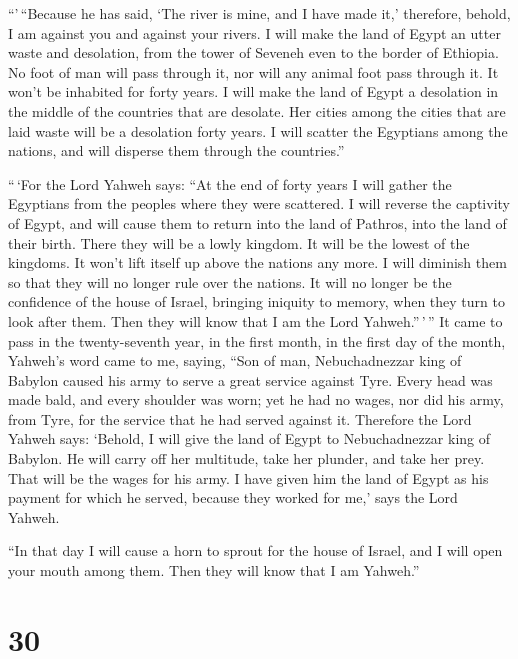 ``'\,``Because he has said, `The river is mine, and I have made it,'
 therefore, behold, I am against you and against your
rivers. I will make the land of Egypt an utter waste and desolation,
from the tower of Seveneh even to the border of Ethiopia.
 No foot of man will pass through it, nor will any animal
foot pass through it. It won't be inhabited for forty years.
 I will make the land of Egypt a desolation in the middle
of the countries that are desolate. Her cities among the cities that are
laid waste will be a desolation forty years. I will scatter the
Egyptians among the nations, and will disperse them through the
countries.''

 ``\,`For the Lord Yahweh says: ``At the end of forty
years I will gather the Egyptians from the peoples where they were
scattered.  I will reverse the captivity of Egypt, and
will cause them to return into the land of Pathros, into the land of
their birth. There they will be a lowly kingdom.  It will
be the lowest of the kingdoms. It won't lift itself up above the nations
any more. I will diminish them so that they will no longer rule over the
nations.  It will no longer be the confidence of the
house of Israel, bringing iniquity to memory, when they turn to look
after them. Then they will know that I am the Lord Yahweh.''\,'\,''
 It came to pass in the twenty-seventh year, in the first
month, in the first day of the month, Yahweh's word came to me, saying,
 ``Son of man, Nebuchadnezzar king of Babylon caused his
army to serve a great service against Tyre. Every head was made bald,
and every shoulder was worn; yet he had no wages, nor did his army, from
Tyre, for the service that he had served against it. 
Therefore the Lord Yahweh says: `Behold, I will give the land of Egypt
to Nebuchadnezzar king of Babylon. He will carry off her multitude, take
her plunder, and take her prey. That will be the wages for his army.
 I have given him the land of Egypt as his payment for
which he served, because they worked for me,' says the Lord Yahweh.

 ``In that day I will cause a horn to sprout for the
house of Israel, and I will open your mouth among them. Then they will
know that I am Yahweh.''

\hypertarget{section-28}{%
\section{30}\label{section-28}}

